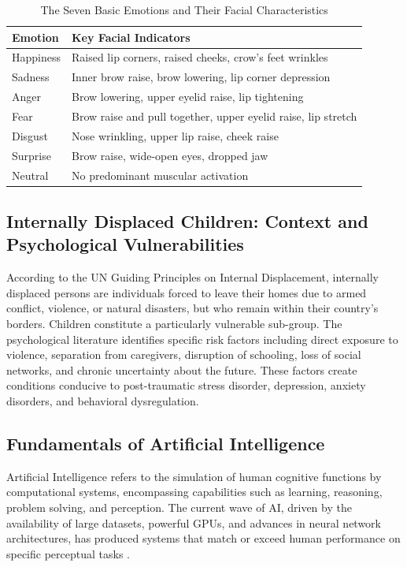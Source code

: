 \documentclass[a4paper,12pt,oneside]{report}
\begin{document}
\begin{table}[H]
\centering
\caption{The Seven Basic Emotions and Their Facial Characteristics}
\begin{tabular}{|l|p{9cm}|}
\hline
\textbf{Emotion} & \textbf{Key Facial Indicators} \\
\hline
Happiness  & Raised lip corners, raised cheeks, crow's feet wrinkles \\
\hline
Sadness    & Inner brow raise, brow lowering, lip corner depression \\
\hline
Anger      & Brow lowering, upper eyelid raise, lip tightening \\
\hline
Fear       & Brow raise and pull together, upper eyelid raise, lip stretch \\
\hline
Disgust    & Nose wrinkling, upper lip raise, cheek raise \\
\hline
Surprise   & Brow raise, wide-open eyes, dropped jaw \\
\hline
Neutral    & No predominant muscular activation \\
\hline
\end{tabular}
\label{tab:emotions}
\end{table}

\subsection{Internally Displaced Children: Context and Psychological Vulnerabilities}

According to the UN Guiding Principles on Internal Displacement, internally
displaced persons are individuals forced to leave their homes due to armed
conflict, violence, or natural disasters, but who remain within their country's
borders. Children constitute a particularly vulnerable sub-group. The
psychological literature identifies specific risk factors including direct
exposure to violence, separation from caregivers, disruption of schooling, loss
of social networks, and chronic uncertainty about the future. These factors
create conditions conducive to post-traumatic stress disorder, depression, anxiety
disorders, and behavioral dysregulation.

\subsection{Fundamentals of Artificial Intelligence}

Artificial Intelligence refers to the simulation of human cognitive functions by
computational systems, encompassing capabilities such as learning, reasoning,
problem solving, and perception. The current wave of AI, driven by the
availability of large datasets, powerful GPUs, and advances in neural network
architectures, has produced systems that match or exceed human performance on
specific perceptual tasks \cite{lecun1998}.
\end{document}
